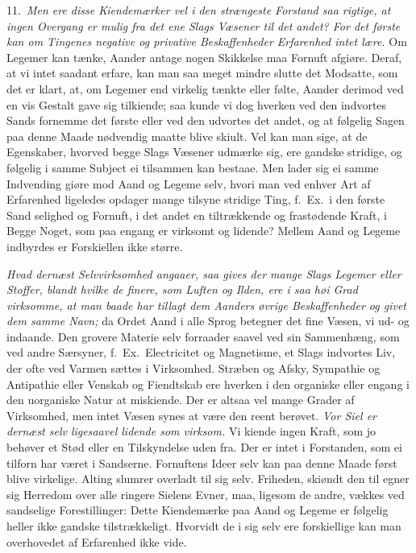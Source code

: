 \documentclass[12pt,a4paper]{article}
\newcommand{\opage}[1]{\marginnote{\footnotesize\textit{[#1]}}}
\begin{document}
11.~\emph{Men ere disse Kiendemærker vel i den strængeste Forstand saa rigtige,
at ingen Overgang er mulig fra det ene Slags Væsener til det andet? For det
første kan om Tingenes negative og privative Beskaffenheder Erfarenhed intet
lære.} Om Legemer kan tænke, Aander antage nogen Skikkelse maa Fornuft afgiøre.
Deraf, at vi intet saadant erfare, kan man saa meget mindre slutte det Modsatte,
som det er klart, at, om Legemer end virkelig tænkte eller følte, Aander derimod
ved en vis Gestalt gave sig tilkiende; saa kunde vi dog hverken ved den indvortes
Sands fornemme det første eller ved den udvortes det andet, og at følgelig Sagen
paa denne Maade nødvendig maatte blive skiult. Vel kan man sige, at de
Egenskaber, hvorved begge Slags Væsener udmærke sig, ere gandske stridige, og
følgelig i samme Subject ei tilsammen kan bestaae. Men lader sig ei samme
Indvending giøre mod Aand og Legeme selv, hvori man ved enhver Art af Erfarenhed
ligeledes opdager mange tilsyne stridige Ting, f.~Ex.\ i den første Sand%
\opage{22}selighed og Fornuft, i det andet en tiltrækkende og frastødende Kraft, i Begge
Noget, som paa engang er virksomt og lidende? Mellem Aand og Legeme indbyrdes er
Forskiellen ikke større.

\emph{Hvad dernæst Selvvirksomhed angaaer, saa gives der mange Slags Legemer
eller Stoffer, blandt hvilke de finere, som Luften og Ilden, ere i saa høi Grad
virksomme, at man baade har tillagt dem Aanders øvrige Beskaffenheder og givet
dem samme Navn;} da Ordet Aand i alle Sprog betegner det fine Væsen, vi ud- og
indaande. Den grovere Materie selv forraader saavel ved sin Sammenhæng, som ved
andre Særsyner, f.~Ex.\ Electricitet og Magnetisme, et Slags indvortes Liv, der
ofte ved Varmen sættes i Virksomhed. Stræben og Afsky, Sympathie og Antipathie
eller Venskab og Fiendtskab ere hverken i den organiske eller engang i den
uorganiske Natur at miskiende. Der er altsaa vel mange Grader af Virksomhed, men
intet Væsen synes at være den reent berøvet. \emph{Vor Siel er dernæst selv
ligesaavel lidende som virksom.} Vi kiende ingen Kraft, som jo behøver et Stød
eller en Tilskyndelse uden fra. Der er intet i Forstanden, som ei tilforn har
været i Sandserne. Fornuftens Ideer selv kan paa denne Maade først blive
virkelige. Alting slumrer overladt til sig selv. Friheden, skiøndt den til%
\opage{23}egner sig Herredom over alle ringere Sielens Evner, maa, ligesom de andre, vækkes
ved sandselige Forestillinger: Dette Kiendemærke paa Aand og Legeme er følgelig
heller ikke gandske tilstrækkeligt. Hvorvidt de i sig selv ere forskiellige kan
man overhovedet af Erfarenhed ikke vide.
\end{document}
